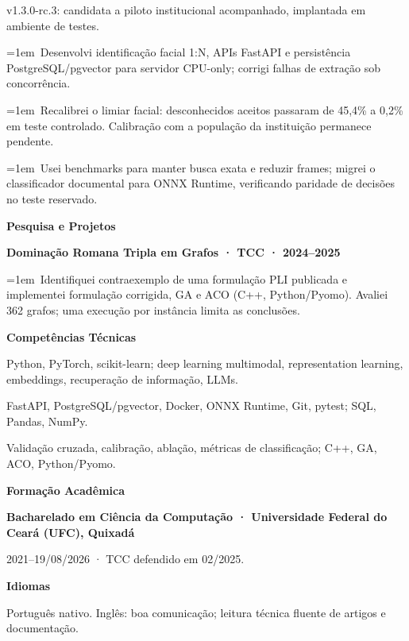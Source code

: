 \documentclass[a4paper,10pt]{article}
\begin{document}
v1.3.0-rc.3: candidata a piloto institucional acompanhado, implantada em ambiente de testes.\par
\hangindent=1em\textbullet\ Desenvolvi identificação facial 1:N, APIs FastAPI e persistência PostgreSQL/pgvector para servidor CPU-only; corrigi falhas de extração sob concorrência.\par
\hangindent=1em\textbullet\ Recalibrei o limiar facial: desconhecidos aceitos passaram de 45,4\% a 0,2\% em teste controlado. Calibração com a população da instituição permanece pendente.\par
\hangindent=1em\textbullet\ Usei benchmarks para manter busca exata e reduzir frames; migrei o classificador documental para ONNX Runtime, verificando paridade de decisões no teste reservado.\par
\vspace{5pt}\textbf{Pesquisa e Projetos}\par
\textbf{Dominação Romana Tripla em Grafos · TCC · 2024–2025}\par
\hangindent=1em\textbullet\ Identifiquei contraexemplo de uma formulação PLI publicada e implementei formulação corrigida, GA e ACO (C++, Python/Pyomo). Avaliei 362 grafos; uma execução por instância limita as conclusões.\par
\vspace{5pt}\textbf{Competências Técnicas}\par
Python, PyTorch, scikit-learn; deep learning multimodal, representation learning, embeddings, recuperação de informação, LLMs.\par
FastAPI, PostgreSQL/pgvector, Docker, ONNX Runtime, Git, pytest; SQL, Pandas, NumPy.\par
Validação cruzada, calibração, ablação, métricas de classificação; C++, GA, ACO, Python/Pyomo.\par
\vspace{5pt}\textbf{Formação Acadêmica}\par
\textbf{Bacharelado em Ciência da Computação · Universidade Federal do Ceará (UFC), Quixadá}\par
2021–19/08/2026 · TCC defendido em 02/2025.\par
\vspace{5pt}\textbf{Idiomas}\par
Português nativo. Inglês: boa comunicação; leitura técnica fluente de artigos e documentação.\par
\end{document}
